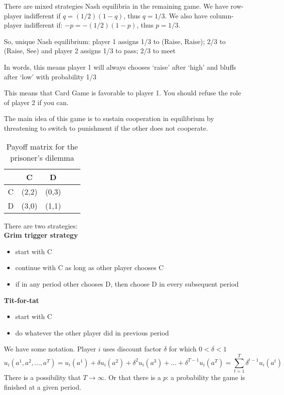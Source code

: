 \begin{illustration}
    There are mixed strategies Nash equilibria in the remaining game. We have row-player indifferent if $q = (1/2)(1-q)$, thus $q = 1/3$. We also have column-player indifferent if: $-p = -(1/2)(1-p)$, thus $p = 1/3$.

    So, unique Nash equilibrium:
    player 1 assigns 1/3 to (Raise, Raise); 2/3 to (Raise, See) and
    player 2 assigns 1/3 to pass; 2/3 to meet

    In words, this means player 1 will always chooses `raise' after `high' and bluffs after `low' with probability 1/3

    This means that Card Game is favorable to player 1. You should refuse the role of player 2 if you can.
\end{illustration}


\begin{illustration} The main idea of this game is to sustain cooperation in equilibrium by threatening to switch to punishment if the other does not cooperate.

    \begin{table}[h!]
        \begin{center}
            \begin{tabular}{ c | c c c c}
                  & C     & D     & \\ \hline
                C & (2,2) & (0,3)   \\
                D & (3,0) & (1,1)
            \end{tabular}
            \caption{Payoff matrix for the prisoner's dilemma}
        \end{center}
    \end{table}

    There are two strategies:\\
    \textbf{Grim trigger strategy}
    \begin{itemize}
        \item start with C
        \item continue with C as long as other player chooses C
        \item if in any period other chooses D, then choose D in every subsequent period
    \end{itemize}
    \textbf{Tit-for-tat}
    \begin{itemize}
        \item start with C
        \item do whatever the other player did in previous period
    \end{itemize}
    We have some notation. Player $i$ uses discount factor $\delta$ for which $0 < \delta < 1$
    $$
        u_i(a^{1}, a^{2}, \ldots, a^{{T}}) = u_i(a^{1})+\delta u_i(a^{2})+\delta^{2} u_i(a^{3})+\ldots+\delta^{{T}-1} u_i(a^{{T}})
        =\sum_{t=1}^{T} \delta^{t-1} u_i(a^{t})
    $$
    There is a possibility that $T \to \infty$. Or that there is a $p$: a probability the game is finished at a given period.
\end{illustration}

